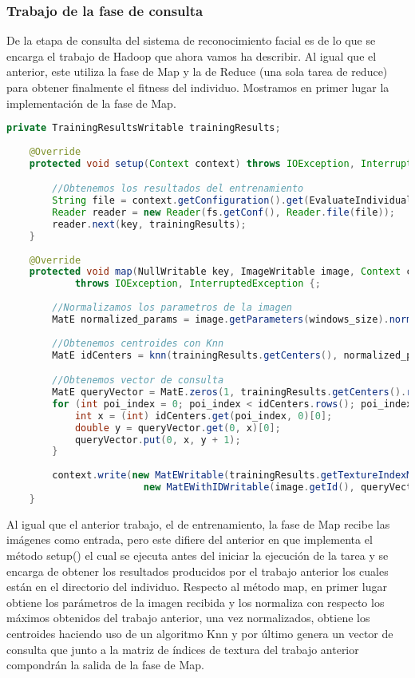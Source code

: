 \subsubsection{Trabajo de la fase de consulta}

De la etapa de consulta del sistema de reconocimiento facial es de lo que se encarga el trabajo de Hadoop que ahora vamos ha describir. Al igual que el anterior, este utiliza la fase de Map y la de Reduce (una sola tarea de reduce) para obtener finalmente el fitness del individuo. Mostramos en primer lugar la implementación de la fase de Map.

 \begin{lstlisting}[language=Java]
 	private TrainingResultsWritable trainingResults;
 
	@Override
	protected void setup(Context context) throws IOException, InterruptedException {

		//Obtenemos los resultados del entrenamiento
		String file = context.getConfiguration().get(EvaluateIndividual.INDIVIDUAL_DIR_PARAM).concat("training/part-r-00000");
		Reader reader = new Reader(fs.getConf(), Reader.file(file));
		reader.next(key, trainingResults);
	}
	
	@Override
	protected void map(NullWritable key, ImageWritable image, Context context)
			throws IOException, InterruptedException {;
		
		//Normalizamos los parametros de la imagen
		MatE normalized_params = image.getParameters(windows_size).normalize(trainingResults.getMaxPerCol());
		
		//Obtenemos centroides con Knn
		MatE idCenters = knn(trainingResults.getCenters(), normalized_params);

		//Obtenemos vector de consulta		
		MatE queryVector = MatE.zeros(1, trainingResults.getCenters().rows(), CvType.CV_64F);
		for (int poi_index = 0; poi_index < idCenters.rows(); poi_index++) {
			int x = (int) idCenters.get(poi_index, 0)[0];
			double y = queryVector.get(0, x)[0];
			queryVector.put(0, x, y + 1);
		}
		
		context.write(new MatEWritable(trainingResults.getTextureIndexMatrix()), 
						new MatEWithIDWritable(image.getId(), queryVector));
	}
\end{lstlisting}

Al igual que el anterior trabajo, el de entrenamiento, la fase de Map recibe las imágenes como entrada, pero este difiere del anterior en que implementa el método setup() el cual se ejecuta antes del iniciar la ejecución de la tarea y se encarga de obtener los resultados producidos por el trabajo anterior los cuales están en el directorio del individuo. Respecto al método map, en primer lugar obtiene los parámetros de la imagen recibida y los normaliza con respecto los máximos obtenidos del trabajo anterior, una vez normalizados, obtiene los centroides haciendo uso de un algoritmo Knn y por \'ultimo genera un vector de consulta que junto a la matriz de \'indices de textura del trabajo anterior compondrán la salida de la fase de Map.

